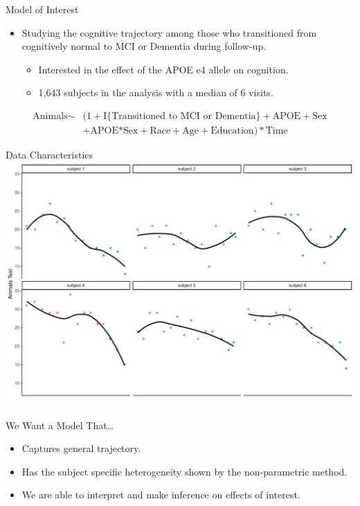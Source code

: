 \documentclass[
  ignorenonframetext,
]{beamer}
\providecommand{\tightlist}{%
  \setlength{\itemsep}{0pt}\setlength{\parskip}{0pt}}
\begin{document}
\begin{frame}{Model of Interest}
\protect\hypertarget{model-of-interest}{}
\begin{itemize}
\tightlist
\item
  Studying the cognitive trajectory among those who transitioned from
  cognitively normal to MCI or Dementia during follow-up.

  \begin{itemize}
  \tightlist
  \item
    Interested in the effect of the APOE e4 allele on cognition.
  \item
    1,643 subjects in the analysis with a median of 6 visits.
  \end{itemize}
\end{itemize}

\begin{equation*}
\begin{aligned}
\text{Animals} \sim & (1 + \text{I\{Transitioned to MCI or Dementia\}} + \text{APOE} + \text{Sex}\\
& + \text{APOE*Sex} + \text{Race} + \text{Age} + \text{Education}) * \text{Time}
\end{aligned}
\end{equation*}
\end{frame}

\begin{frame}{Data Characteristics}
\protect\hypertarget{data-characteristics}{}
\includegraphics{Prez4_files/figure-beamer/unnamed-chunk-7-1.pdf}
\end{frame}

\begin{frame}{We Want a Model That\ldots{}}
\protect\hypertarget{we-want-a-model-that}{}
\begin{itemize}
\tightlist
\item
  Captures general trajectory.
\item
  Has the subject specific heterogeneity shown by the non-parametric
  method.
\item
  We are able to interpret and make inference on effects of interest.
\end{itemize}
\end{frame}
\end{document}
